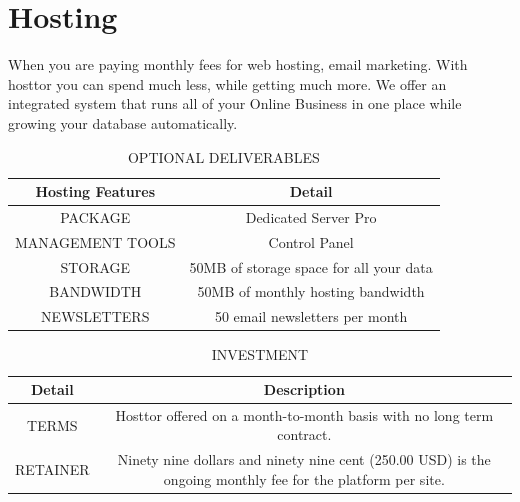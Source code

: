 \documentclass[12pt]{report}
\begin{document}
\section{Hosting}
\item When you are paying monthly fees for web hosting, email marketing. With hosttor you can spend much less, while getting much more. We offer an integrated system that runs all of your Online Business in one place while growing your database automatically.
\begin{table}[ht]
\caption{OPTIONAL DELIVERABLES} %
\centering %
\begin{tabular}{c c} %
\hline\hline %
Hosting Features & Detail \\ [0.5ex] %
\hline %
PACKAGE & Dedicated Server Pro \\ %
MANAGEMENT TOOLS & Control Panel  \\
STORAGE & 50MB of storage space for all your data \\
BANDWIDTH & 50MB of monthly hosting bandwidth \\
NEWSLETTERS & 50 email newsletters per month \\ [1ex] %
\hline %
\end{tabular}
\label{table:nonlin} %
\end{table}

\begin{table}[ht]
\caption{INVESTMENT} %
\centering %
\begin{tabular}{c c} %
\hline\hline %
Detail & Description \\ [0.5ex] %
\hline %
TERMS & Hosttor offered on a month-to-month basis with no long term contract. \\ %
RETAINER & Ninety nine dollars and ninety nine cent (250.00 USD) is the ongoing monthly fee for the platform per site. \\ [1ex] %
\hline %
\end{tabular}
\label{table:nonlin} %
\end{table}
\end{document}
